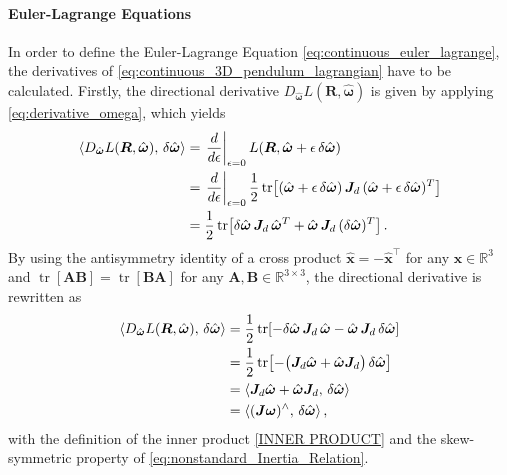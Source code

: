 \paragraph{Euler-Lagrange Equations}

In order to define the Euler-Lagrange Equation \eqref{eq:continuous_euler_lagrange}, the derivatives of \eqref{eq:continuous_3D_pendulum_lagrangian} have to be calculated. Firstly, the directional derivative $D_{\hat{\bm{\omega}}}L(\bm{R,\hat{\bm{\omega}}})$ is given by applying \eqref{eq:derivative_omega}, which yields
\begin{align}
\left\langle D_{\hat{\bm{\omega}}}L(\bm{R},\hat{\bm{\omega}}),\,\delta\hat{\bm{\omega}}\right\rangle
&=
\left.\frac{d}{d\epsilon}\right|_{\epsilon=0}
L\!\left(\bm{R},\hat{\bm{\omega}}+\epsilon\,\delta\hat{\bm{\omega}}\right) \notag\\
&=
\left.\frac{d}{d\epsilon}\right|_{\epsilon=0}
\frac{1}{2}\operatorname{tr}\!\left[
(\hat{\bm{\omega}}+\epsilon\,\delta\hat{\bm{\omega}})
\,\bm{J}_d\,
(\hat{\bm{\omega}}+\epsilon\,\delta\hat{\bm{\omega}})^{T}
\right] \notag\\
&=
\frac{1}{2}\operatorname{tr}\!\left[
\delta\hat{\bm{\omega}}\,\bm{J}_d\,\hat{\bm{\omega}}^{T}
+
\hat{\bm{\omega}}\,\bm{J}_d\,(\delta\hat{\bm{\omega}})^{T}
\right] \notag.
\end{align}
By using the antisymmetry identity of a cross product $\hat{\bm{x}}=-\hat{\bm{x}}^\top$ for any $\bm{x} \in \mathbb{R}^3$ and $\operatorname{tr}[\bm{A}\bm{B}]=\operatorname{tr}[\bm{B}\bm{A}]$ for any $\bm{A},\bm{B} \in \mathbb{R}^{3 \times 3}$, 
the directional derivative is rewritten as
\begin{align}\label{eq:continuous_3D_pendulum_derivative_omega}
\left\langle D_{\hat{\bm{\omega}}}L(\bm{R},\hat{\bm{\omega}}),\,\delta\hat{\bm{\omega}}\right\rangle
&=
\frac{1}{2}\operatorname{tr}\!\left[
-\delta\hat{\bm{\omega}}\,\bm{J}_d\,\hat{\bm{\omega}}
-
\hat{\bm{\omega}}\,\bm{J}_d\,\delta\hat{\bm{\omega}}
\right] \notag \\
&=
\frac{1}{2}\operatorname{tr}\!\left[
-\bigl(\bm{J}_d\hat{\bm{\omega}}+\hat{\bm{\omega}}\bm{J}_d\bigr)
\,\delta\hat{\bm{\omega}}
\right] \notag\\
&=
\left\langle \bm{J}_d\hat{\bm{\omega}}+\hat{\bm{\omega}}\bm{J}_d,\,
\delta\hat{\bm{\omega}}\right\rangle \notag\\
&=
\left\langle (\bm{J}\bm{\omega})^\wedge,\,\delta\hat{\bm{\omega}}\right\rangle,
\end{align}
with the definition of the inner product \ref{INNER PRODUCT} and the skew-symmetric property of \eqref{eq:nonstandard_Inertia_Relation}. 


